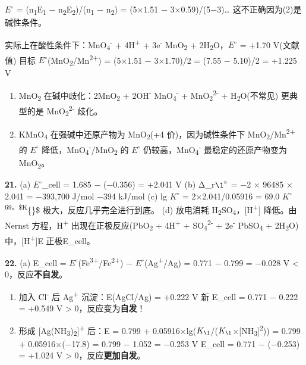 \(E^{\circ}\) = (n\textsubscript{1}E\textsubscript{1} − n\textsubscript{2}E\textsubscript{2})/(n\textsubscript{1} − n\textsubscript{2}) = (5×1.51 − 3×0.59)/(5−3)\ldots{} 这不正确因为(2)是碱性条件。

实际上在酸性条件下：MnO\textsubscript{4}\textsuperscript{-} + 4H\textsuperscript{+} + 3e\textsuperscript{-} \箭 MnO\textsubscript{2} + 2H\textsubscript{2}O，\(E^{\circ}\) = +1.70 V(文献值)
目标 \(E^{\circ}\)(MnO\textsubscript{2}/Mn\textsuperscript{2+}) = (5×1.51 − 3×1.70)/2 = (7.55 − 5.10)/2 = +1.225 V

\begin{enumerate}
\def\labelenumi{(\alph{enumi})}
\setcounter{enumi}{1}
\item
  MnO\textsubscript{2} 在碱中歧化：2MnO\textsubscript{2} + 2OH\textsuperscript{-} \箭 MnO\textsubscript{4}\textsuperscript{-} + MnO\textsubscript{2}\textsuperscript{2-} + H\textsubscript{2}O(不常见)
  更典型的是 MnO\textsubscript{2}\textsuperscript{2-} 歧化。
\item
  KMnO\textsubscript{4} 在强碱中还原产物为 MnO\textsubscript{2}(+4 价)，因为碱性条件下 MnO\textsubscript{2}/Mn\textsuperscript{2+} 的 \(E^{\circ}\) 降低，MnO\textsubscript{4}\textsuperscript{-}/MnO\textsubscript{2} 的 \(E^{\circ}\) 仍较高，MnO\textsubscript{4}\textsuperscript{-} 最稳定的还原产物变为 MnO\textsubscript{2}。
\end{enumerate}

\textbf{21.}
(a) \(E^{\circ}\)\_cell = 1.685 − (−0.356) = +2.041 V
(b) Δ\_r\(\1^{\circ}\) = −2 × 96485 × 2.041 = −393,700 J/mol  −394 kJ/mol
(c) lg \(K^{\circ}\) = 2×2.041/0.05916 = 69.0 \箭 \(K^{\circ}\) \textsuperscript{69。\$K}\{\circ\}\$ 极大，反应几乎完全进行到底。
(d) 放电消耗 H\textsubscript{2}SO\textsubscript{4}，{[}H\textsuperscript{+}{]} 降低。由 Nernst 方程，H\textsuperscript{+} 出现在正极反应(PbO\textsubscript{2} + 4H\textsuperscript{+} + SO\textsubscript{4}\textsuperscript{2-} + 2e\textsuperscript{-} \箭 PbSO\textsubscript{4} + 2H\textsubscript{2}O)中，{[}H\textsuperscript{+}{]} \箭 E 正极 \箭 E\_cell。

\textbf{22.}
(a) E\_cell = \(E^{\circ}\)(Fe\textsuperscript{3+}/Fe\textsuperscript{2+}) − \(E^{\circ}\)(Ag\textsuperscript{+}/Ag) = 0.771 − 0.799 = −0.028 V \textless{} 0，反应\textbf{不自发}。

\begin{enumerate}
\def\labelenumi{(\alph{enumi})}
\setcounter{enumi}{1}
\item
  加入 Cl\textsuperscript{-} 后 Ag\textsuperscript{+} 沉淀：E(AgCl/Ag) = +0.222 V
  新 E\_cell = 0.771 − 0.222 = +0.549 V \textgreater{} 0，反应变为\textbf{自发}！
\item
  形成 {[}Ag(NH\textsubscript{3})\textsubscript{2}{]}\textsuperscript{+} 后：E = 0.799 + 0.05916×lg(\(K_{\1}\)/(\(K_{\1}\)×{[}NH\textsubscript{3}{]}\textsuperscript{2}))
  = 0.799 + 0.05916×(−17.8) = 0.799 − 1.052 = −0.253 V
  E\_cell = 0.771 − (−0.253) = +1.024 V \textgreater{} 0，反应\textbf{更加自发}。
\end{enumerate}

